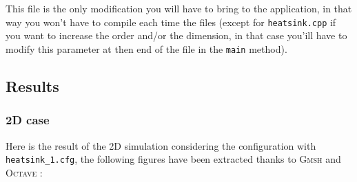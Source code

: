 This file is the only modification you will have to bring to the application, in that way you won't have to compile each time the files (except for \lstinline!heatsink.cpp! if you want to increase the order and/or the dimension, in that case you'ill have to modify this parameter at then end of the file in the \lstinline!main! method).

\subsection{Results}

\subsubsection{2D case}
Here is the result of the 2D simulation considering the configuration with \lstinline!heatsink_1.cfg!, the following figures have been extracted thanks to \textsc{Gmsh} and \textsc{Octave} :
